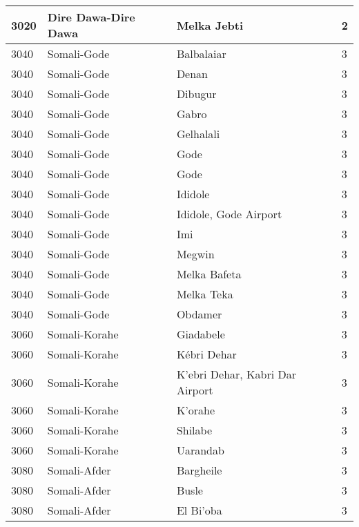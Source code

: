 \documentclass[12pt,a4paper,openbib,titlepage]{report}
\begin{document}
\begin{longtable}{|p{2cm}|p{6.5cm}|p{8cm}|p{1.5cm}|}
\hline 
\rule[-1ex]{0pt}{2.5ex} 3020 & Dire Dawa-Dire Dawa & Melka Jebti & 2 \\
\hline 
\rule[-1ex]{0pt}{2.5ex} 3040 & Somali-Gode & Balbalaiar & 3 \\ 
\hline 
\rule[-1ex]{0pt}{2.5ex} 3040 & Somali-Gode & Denan & 3 \\ 
\hline 
\rule[-1ex]{0pt}{2.5ex} 3040 & Somali-Gode & Dibugur & 3 \\ 
\hline 
\rule[-1ex]{0pt}{2.5ex} 3040 & Somali-Gode & Gabro & 3 \\ 
\hline 
\rule[-1ex]{0pt}{2.5ex} 3040 & Somali-Gode & Gelhalali & 3 \\  
\hline 
\rule[-1ex]{0pt}{2.5ex} 3040 & Somali-Gode & Gode & 3 \\ 
\hline 
\rule[-1ex]{0pt}{2.5ex} 3040 & Somali-Gode & Gode & 3 \\ 
\hline 
\rule[-1ex]{0pt}{2.5ex} 3040 & Somali-Gode & Ididole & 3 \\ 
\hline 
\rule[-1ex]{0pt}{2.5ex} 3040 & Somali-Gode & Ididole, Gode Airport & 3 \\ 
\hline 
\rule[-1ex]{0pt}{2.5ex} 3040 & Somali-Gode & Imi & 3 \\ 
\hline 
\rule[-1ex]{0pt}{2.5ex} 3040 & Somali-Gode & Megwin & 3 \\ 
\hline 
\rule[-1ex]{0pt}{2.5ex} 3040 & Somali-Gode & Melka Bafeta & 3 \\ 
\hline 
\rule[-1ex]{0pt}{2.5ex} 3040 & Somali-Gode & Melka Teka & 3 \\ 
\hline 
\rule[-1ex]{0pt}{2.5ex} 3040 & Somali-Gode & Obdamer & 3 \\ 
\hline 
\rule[-1ex]{0pt}{2.5ex} 3060 & Somali-Korahe & Giadabele & 3 \\ 
\hline 
\rule[-1ex]{0pt}{2.5ex} 3060 & Somali-Korahe & K\'ebri Dehar & 3 \\ 
\hline 
\rule[-1ex]{0pt}{2.5ex} 3060 & Somali-Korahe & K'ebri Dehar, Kabri Dar Airport & 3 \\ 
\hline 
\rule[-1ex]{0pt}{2.5ex} 3060 & Somali-Korahe & K'orahe & 3 \\ 
\hline 
\rule[-1ex]{0pt}{2.5ex} 3060 & Somali-Korahe & Shilabe & 3 \\ 
\hline 
\rule[-1ex]{0pt}{2.5ex} 3060 & Somali-Korahe & Uarandab & 3 \\ 
\hline 
\rule[-1ex]{0pt}{2.5ex} 3080 & Somali-Afder & Bargheile & 3 \\ 
\hline 
\rule[-1ex]{0pt}{2.5ex} 3080 & Somali-Afder & Busle & 3 \\ 
\hline 
\rule[-1ex]{0pt}{2.5ex} 3080 & Somali-Afder & El Bi'oba & 3 \\ 

\end{longtable}
\end{document}
